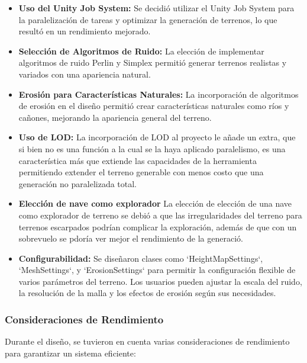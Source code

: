 \begin{itemize}
    \item \textbf{Uso del Unity Job System:} Se decidió utilizar el Unity Job System para la paralelización de tareas y optimizar la generación de terrenos, lo que resultó en un rendimiento mejorado.
    
    \item \textbf{Selección de Algoritmos de Ruido:} La elección de implementar algoritmos de ruido Perlin y Simplex permitió generar terrenos realistas y variados con una apariencia natural.
    
    \item \textbf{Erosión para Características Naturales:} La incorporación de algoritmos de erosión en el diseño permitió crear características naturales como ríos y cañones, mejorando la apariencia general del terreno.
    
    \item \textbf{Uso de LOD:} La incorporación de LOD al proyecto le añade un extra, que si bien no es una función a la cual se la haya aplicado paralelismo, es una característica más que extiende las capacidades de la herramienta permitiendo extender el terreno generable con menos costo que una generación no paralelizada total.
    
    \item \textbf{Elección de nave como explorador} La elección de elección de una nave como explorador de terreno se debió a que las irregularidades del terreno para terrenos escarpados podrían complicar la exploración, además de que con un sobrevuelo se pdoría ver mejor el rendimiento de la generació.
    
    \item \textbf{Configurabilidad:} Se diseñaron clases como `HeightMapSettings`, `MeshSettings`, y `ErosionSettings` para permitir la configuración flexible de varios parámetros del terreno. Los usuarios pueden ajustar la escala del ruido, la resolución de la malla y los efectos de erosión según sus necesidades.

\end{itemize}

\subsubsection{Consideraciones de Rendimiento}

Durante el diseño, se tuvieron en cuenta varias consideraciones de rendimiento para garantizar un sistema eficiente:

